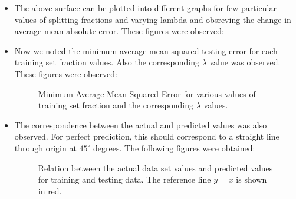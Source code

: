 \documentclass{article}
\begin{document}
\begin{itemize}
\item The above surface can be plotted into different graphs for few particular values of splitting-fractions and varying lambda and obsreving the change in average mean absolute error. These figures were observed:



\item Now we noted the minimum average mean squared testing error for each training set fraction values. Also the corresponding $\lambda$ value was observed. These figures were observed:

\begin{figure}[!h]
 \caption{Minimum Average Mean Squared Error for various values of training set fraction and the corresponding $\lambda$ values.}
 \end{figure}
 
\item The correspondence between the actual and predicted values was also observed. For perfect prediction, this should correspond to a straight line through origin at $45^\circ$ degrees. The following figures were obtained:

\begin{figure}[!h]
 \caption{Relation between the actual data set values and predicted values for training and testing data. The reference line $y=x$ is shown in red.}
 \end{figure}
 
\end{itemize}
\end{document}
